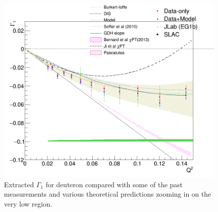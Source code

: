 \begin{figure}[H] %
  \centering
  \leavevmode \includegraphics[width=1.0\textwidth]{figuresEG4/FigResults/integralsFromCombinedG1nA1F1_Wbins70Gm1LowerQ2.png} 
  \caption[$\Gamma^d_1$ (log scale).]{Extracted $\Gamma_1$ for deuteron compared with some of the past measurements and various theoretical predictions zooming in on the very low \qsq region.}
  \label{Gamma1Log}  
\end{figure}






